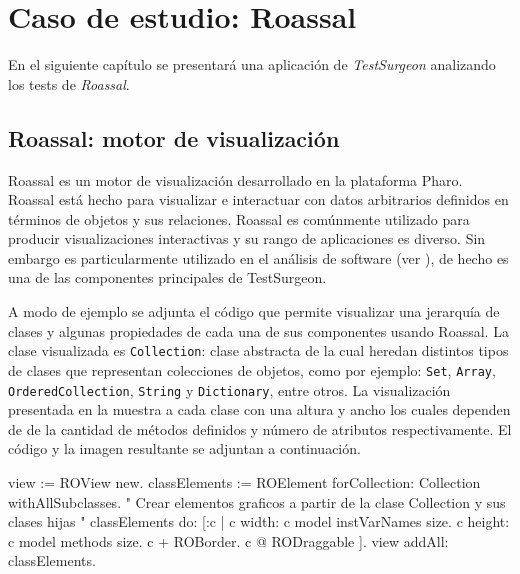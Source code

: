 \chapter{Caso de estudio: Roassal}


\par En el siguiente capítulo se presentará una aplicación de \emph{TestSurgeon} analizando los tests de \emph{Roassal}. 

\section{Roassal: motor de visualización}

\par Roassal es un motor de visualización desarrollado en la plataforma Pharo. Roassal está hecho para visualizar e interactuar con datos arbitrarios definidos en términos de objetos y sus relaciones. Roassal es comúnmente utilizado para producir visualizaciones interactivas y su rango de aplicaciones es diverso. Sin embargo es particularmente utilizado en el análisis de software (ver ), de hecho es una de las componentes principales de TestSurgeon.

\par A modo de ejemplo se adjunta el código que permite visualizar una jerarquía de clases y algunas propiedades de cada una de sus componentes usando Roassal. La clase visualizada es {\tt Collection}: clase abstracta de la cual heredan distintos tipos de clases que representan colecciones de objetos, como por ejemplo: {\tt Set}, {\tt Array}, {\tt OrderedCollection}, {\tt String} y {\tt Dictionary}, entre otros. La visualización presentada en la  muestra a cada clase con una altura y ancho los cuales dependen de de la cantidad de métodos definidos y número de atributos respectivamente. El código y la imagen resultante se adjuntan a continuación.\\

\begin{code}
view := ROView new.
classElements := ROElement forCollection:
	Collection withAllSubclasses.
" Crear elementos graficos a partir de la clase Collection y sus clases hijas "
classElements
	do: [:c |
		c width: c model instVarNames size.
		c height: c model methods size.
		c + ROBorder.
		c @ RODraggable ].
view addAll: classElements.
\end{code}

